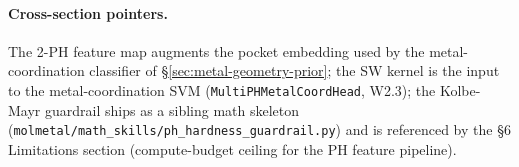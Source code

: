 \paragraph{Cross-section pointers.}
The 2-PH feature map augments the pocket embedding used by the
metal-coordination classifier of \S\ref{sec:metal-geometry-prior};
the SW kernel is the input to the metal-coordination SVM
(\texttt{MultiPHMetalCoordHead}, W2.3); the Kolbe-Mayr guardrail
ships as a sibling math skeleton
(\texttt{molmetal/math\_skills/ph\_hardness\_guardrail.py}) and is
referenced by the §6 Limitations section (compute-budget ceiling
for the PH feature pipeline).

\makeatletter
\let\cite\WForigCiteMultiPH
\makeatother